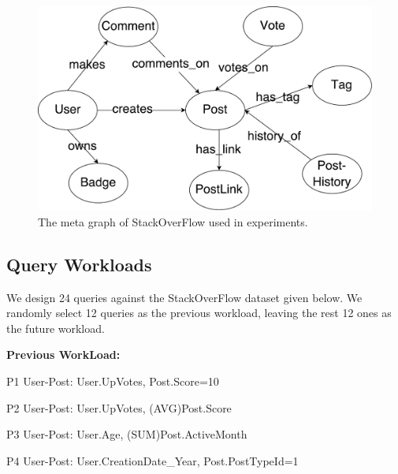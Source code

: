 \begin{figure}[H]
	\centering
	\includegraphics[scale=0.37]{pic/expmeta.pdf}
	\caption{The meta graph of StackOverFlow used in experiments.}
	\label{fig:metaexp}
\end{figure}



\subsection{Query Workloads}
We design 24  queries against the StackOverFlow dataset given below. We randomly select 12 queries as the previous workload, leaving the rest 12 ones as the future workload.  %


\textbf{Previous WorkLoad:}

P1 \hspace{3mm} User-Post: User.UpVotes, Post.Score=10

P2 \hspace{3mm} User-Post: User.UpVotes, (AVG)Post.Score

P3 \hspace{3mm} User-Post: User.Age, (SUM)Post.ActiveMonth

P4 \hspace{3mm} User-Post: User.CreationDate\_Year, Post.PostTypeId=1

